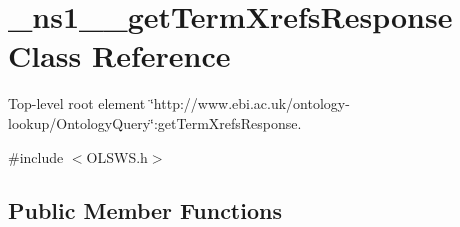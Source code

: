 \hypertarget{class__ns1____getTermXrefsResponse}{
\section{\_\-ns1\_\-\_\-getTermXrefsResponse Class Reference}
\label{class__ns1____getTermXrefsResponse}
}


Top-\/level root element \char`\"{}http://www.ebi.ac.uk/ontology-\/lookup/OntologyQuery\char`\"{}:getTermXrefsResponse.  




{\ttfamily \#include $<$OLSWS.h$>$}

\subsection*{Public Member Functions}
